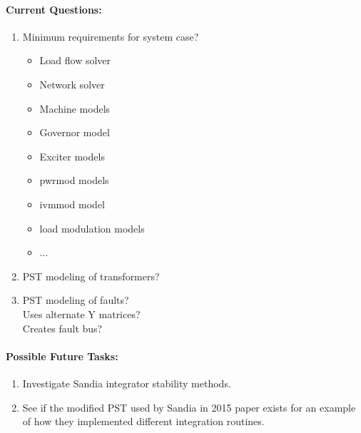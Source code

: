 \documentclass[12pt]{article}
\begin{document}
\begin{multicols}{2}
\paragraph{Current Questions:}
	\begin{enumerate}
	\itemsep0em 
		\item Minimum requirements for system case?
		\begin{itemize}
		\footnotesize
			\item Load flow solver
			\item Network solver
			\item Machine models
			\item Governor model
			\item Exciter models
			\item pwrmod models
			\item ivmmod model
			\item load modulation models
			\item ...
		\end{itemize}
		\item PST modeling of transformers?
		\item PST modeling of faults? \\
		Uses alternate Y matrices? \\
		Creates fault bus?
	\end{enumerate}

\paragraph{Possible Future Tasks:} %
	\begin{enumerate}
		\item Investigate Sandia integrator stability methods.	
		\item See if the modified PST used by Sandia in 2015 paper exists for an example of how they implemented different integration routines.	
	\end{enumerate}

\vfill\null
\end{multicols}
\end{document}

